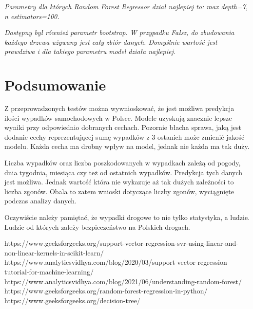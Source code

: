 \documentclass{article}
\begin{document}
\textit{Parametry dla których Random Forest Regressor dział najlepiej to: max depth=7, n estimators=100.}

\textit{Dostępny był również parametr bootstrap. W przypadku Fałsz, do zbudowania każdego drzewa używany jest cały zbiór danych. Domyślnie wartość jest prawdziwa i dla takiego parametru model działa najlepiej.}

\section{Podsumowanie}

Z przeprowadzonych testów można wywnioskować, że jest możliwa predykcja ilości wypadków samochodowych w Polsce. Modele uzyskują znacznie lepsze wyniki przy odpowiednio dobranych cechach. Pozornie błacha sprawa, jaką jest dodanie cechy reprezentującej sumę wypadków z 3 ostanich może zmienić jakość modelu. 
Każda cecha ma drobny wpływ na model, jednak nie każda ma tak duży.

Liczba wypadków oraz liczba poszkodowanych w wypadkach zależą od pogody, dnia tygodnia, miesiąca czy też od ostatnich wypadków. Predykcja tych danych jest możliwa. Jednak wartość która nie wykazuje aż tak dużych zależności to liczba zgonów. 
Obala to zatem wnioski dotyczące liczby zgonów, wyciągnięte podczas analizy danych.  

Oczywiście należy pamiętać, że wypadki drogowe to nie tylko statystyka, a ludzie. Ludzie od których zależy bezpieczeństwo na Polskich drogach.

\begin{thebibliography}{9}
    https://www.geeksforgeeks.org/support-vector-regression-svr-using-linear-and-non-linear-kernels-in-scikit-learn/
    https://www.analyticsvidhya.com/blog/2020/03/support-vector-regression-tutorial-for-machine-learning/
    https://www.analyticsvidhya.com/blog/2021/06/understanding-random-forest/
    https://www.geeksforgeeks.org/random-forest-regression-in-python/
    https://www.geeksforgeeks.org/decision-tree/
\end{thebibliography}
\end{document}
